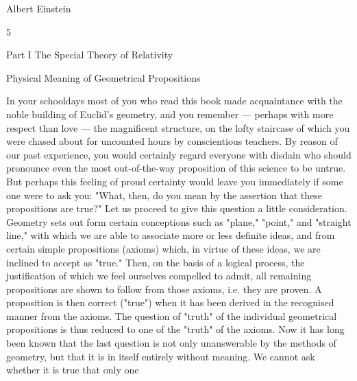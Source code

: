 \documentclass{article}
\begin{document}
Albert Einstein

5

Part I
The Special Theory of Relativity

Physical Meaning of Geometrical
Propositions

In your schooldays most of you who read this book made acquaintance with the noble
building of Euclid's geometry, and you remember — perhaps with more respect than love
— the magnificent structure, on the lofty staircase of which you were chased about for
uncounted hours by conscientious teachers. By reason of our past experience, you would
certainly regard everyone with disdain who should pronounce even the most out-of-the-way
proposition of this science to be untrue. But perhaps this feeling of proud certainty would
leave you immediately if some one were to ask you: "What, then, do you mean by the
assertion that these propositions are true?" Let us proceed to give this question a little
consideration.
Geometry sets out form certain conceptions such as "plane," "point," and "straight line,"
with which we are able to associate more or less definite ideas, and from certain simple
propositions (axioms) which, in virtue of these ideas, we are inclined to accept as "true."
Then, on the basis of a logical process, the justification of which we feel ourselves
compelled to admit, all remaining propositions are shown to follow from those axioms, i.e.
they are proven. A proposition is then correct ("true") when it has been derived in the
recognised manner from the axioms. The question of "truth" of the individual geometrical
propositions is thus reduced to one of the "truth" of the axioms. Now it has long been
known that the last question is not only unanswerable by the methods of geometry, but that
it is in itself entirely without meaning. We cannot ask whether it is true that only one
\end{document}
